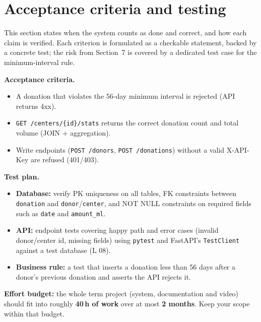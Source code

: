 \documentclass[11pt,a4paper]{article}
\begin{document}
\section{Acceptance criteria and testing}

This section states when the system counts as done and correct, and how each
claim is verified. Each criterion is formulated as a checkable statement,
backed by a concrete test; the risk from Section~7 is covered by a dedicated
test case for the minimum-interval rule.

\textbf{Acceptance criteria.}
\begin{itemize}[topsep=2pt]
  \item A donation that violates the 56-day minimum interval is rejected (API returns 4xx).
  \item \texttt{GET /centers/\{id\}/stats} returns the correct donation count and total volume (JOIN + aggregation).
  \item Write endpoints (\texttt{POST /donors}, \texttt{POST /donations}) without a valid X-API-Key are refused (401/403).
\end{itemize}

\textbf{Test plan.}
\begin{itemize}[topsep=2pt]
  \item \textbf{Database:} verify PK uniqueness on all tables, FK constraints
        between \texttt{donation} and \texttt{donor}/\texttt{center}, and
        NOT NULL constraints on required fields such as \texttt{date} and \texttt{amount\_ml}.
  \item \textbf{API:} endpoint tests covering happy path and error cases (invalid
        donor/center id, missing fields) using \texttt{pytest} and FastAPI's
        \texttt{TestClient} against a test database (L 08).
  \item \textbf{Business rule:} a test that inserts a donation less than 56 days
        after a donor's previous donation and asserts the API rejects it.
\end{itemize}
\vspace{1em}
\begin{infobox}
\textbf{Effort budget:} the whole term project (system, documentation and video)
should fit into roughly \textbf{40\,h of work} over at most \textbf{2 months}.
Keep your scope within that budget.
\end{infobox}
\end{document}
